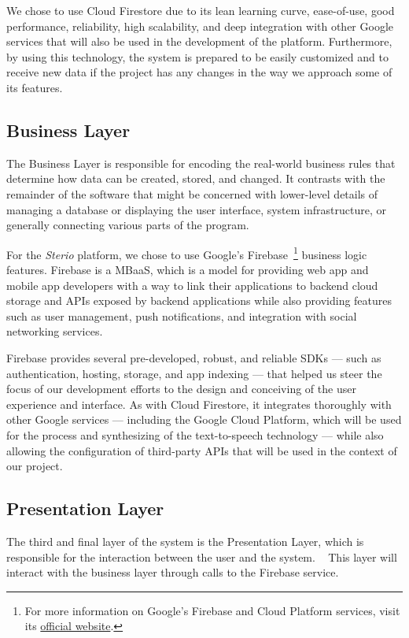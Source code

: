 We chose to use Cloud Firestore due to its lean learning curve, ease-of-use, good performance, reliability, high scalability, and deep integration with other Google services that will also be used in the development of the platform. Furthermore, by using this technology, the system is prepared to be easily customized and to receive new data if the project has any changes in the way we approach some of its features.


\subsection{Business Layer}

The Business Layer is responsible for encoding the real-world business rules that determine how data can be created, stored, and changed. It contrasts with the remainder of the software that might be concerned with lower-level details of managing a database or displaying the user interface, system infrastructure, or generally connecting various parts of the program. ~\cite{Aarsten}

For the \textit{Sterio} platform, we chose to use Google's Firebase~\footnote{For more information on Google's Firebase and Cloud Platform services, visit its \href{https://firebase.google.com/}{official website}.} business logic features. Firebase is a \ac{MBaaS}, which is a model for providing web app and mobile app developers with a way to link their applications to backend cloud storage and \acp{API} exposed by backend applications while also providing features such as user management, push notifications, and integration with social networking services.

Firebase provides several pre-developed, robust, and reliable \acp{SDK} — such as authentication, hosting, storage, and app indexing — that helped us steer the focus of our development efforts to the design and conceiving of the user experience and interface. As with Cloud Firestore, it integrates thoroughly with other Google services — including the Google Cloud Platform, which will be used for the process and synthesizing of the text-to-speech technology — while also allowing the configuration of third-party \acp{API} that will be used in the context of our project.

\subsection{Presentation Layer}

The third and final layer of the system is the Presentation Layer, which is responsible for the interaction between the user and the system. ~\cite{Aarsten} This layer will interact with the business layer through calls to the Firebase service.

